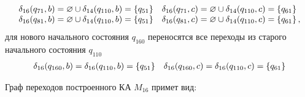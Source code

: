 \begin{enumerate}
\begin{align*}
		      \begin{array}{ll}
			      \delta_{16}(q_{71}, b) = \varnothing \cup \delta_{14}(q_{110}, b) = \left\{q_{51}\right\} & \delta_{16}(q_{71}, c) = \varnothing \cup \delta_{14}(q_{110}, c) = \left\{q_{61}\right\}  \\
			      \delta_{16}(q_{81}, b) = \varnothing \cup \delta_{14}(q_{110}, b) = \left\{q_{51}\right\} & \delta_{16}(q_{81}, c) = \varnothing \cup \delta_{14}(q_{110}, c) = \left\{q_{61}\right\},
		      \end{array}
	      \end{align*}
	      для нового начального состояния \(q_{160}\) переносятся все переходы из старого начального состояния \(q_{110}\)
	      \begin{align*}
		      \begin{array}{ll}
			      \delta_{16}(q_{160}, b) = \delta_{16}(q_{110}, b) = \left\{q_{51}\right\} & \delta_{16}(q_{160}, c) = \delta_{16}(q_{110}, c) = \left\{q_{61}\right\}
		      \end{array}
	      \end{align*}
\end{enumerate}
Граф переходов построенного КА \(M_{16}\) примет вид:
